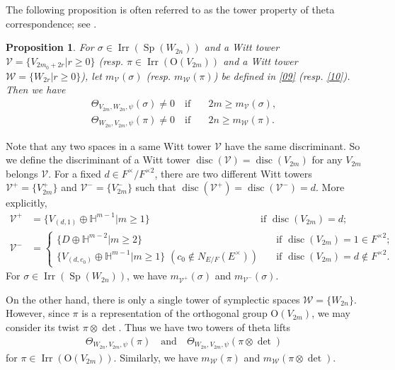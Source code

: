 \documentclass[article]{article}
\numberwithin{equation}{section}
\newtheorem{proposition}[theorem]{Proposition}
\theoremstyle{definition}
\DeclareMathOperator{\SP}{Sp}
\DeclareMathOperator{\Irr}{Irr}
\DeclareMathOperator{\disc}{disc}
\begin{document}
The following proposition is often referred to as the tower property of theta correspondence; see \cite{MR818351}. 
\begin{proposition}\label{tower}
For $\sigma \in \Irr(\SP(W_{2n}))$ and a Witt tower 
$\mathcal V=\{V_{2m_0+2r}|r\geq 0\}$ (resp. $\pi\in \Irr(\mathrm O(V_{2m}))$ and a Witt tower $\mathcal W=\{W_{2r}|r\geq 0\}$), let $m_{\mathcal V}(\sigma)$ (resp. $m_{\mathcal W}(\pi)$) be defined in \ref{09} (resp. \ref{10}). Then we have 
	\begin{align*}
	\Theta_{V_{2m},W_{2n},\psi}(\sigma)\neq 0 \quad \mbox{if}\quad& 2m\geq m_{\mathcal V}(\sigma),\\
	\Theta_{W_{2n},V_{2m},\psi}(\pi)\neq 0 \quad \mbox{if}\quad &2n\geq m_{\mathcal W}(\pi).
	\end{align*}
\end{proposition}
Note that any two spaces in a same Witt tower $\mathcal V$ have the same discriminant. So we define the discriminant of a Witt tower $\disc(\mathcal V)=\disc(V_{2m})$ for any $V_{2m}$ belongs $\mathcal V$. For a fixed $d\in F^\times /F^{\times 2}$, there are two different Witt towers $\mathcal V^+=\{V^+_{2m}\}$ and $\mathcal V^-=\{V^{-}_{2m}\}$ such that $\disc(\mathcal V^+)=\disc(\mathcal V^-)=d$. More explicitly,  
\begin{align*}
\mathcal V^+&=\{V_{(d,1)}\oplus \mathbb H^{m-1}|m\geq 1\} \qquad\qquad\qquad\qquad\qquad\quad \,\mbox{if $\disc(V_{2m})=d$};\\
\mathcal V^-&=\begin{cases*}
\{D\oplus \mathbb H^{m-2}|m\geq 2\} \quad &\mbox{if $\disc(V_{2m})=1\in F^{\times 2}$};\\
\{V_{(d,c_0)}\oplus \mathbb H^{m-1}|m\geq 1\}\,\, (c_0\notin N_{E/F}(E^\times))\quad &\mbox{if $\disc(V_{2m})=d\notin F^{\times 2}$}. 
\end{cases*} 
\end{align*}
For $\sigma\in \Irr(\SP(W_{2n}))$, we have $m_{\mathcal V^+}(\sigma)$ and $m_{\mathcal V^-}(\sigma)$. 

On the other hand, there is only a single tower of symplectic spaces $\mathcal W=\{W_{2n}\}$. However, since $\pi$ is a representation of the orthogonal group $\mathrm O(V_{2m})$, we may consider its twist $\pi\otimes\det$. Thus we have two towers of theta lifts 
\begin{align*}
\Theta_{W_{2n},V_{2m},\psi}(\pi)\quad \mbox{and}\quad  \Theta_{W_{2n},V_{2m},\psi}(\pi\otimes\det)
\end{align*}
for $\pi\in \Irr(\mathrm O(V_{2m}))$. Similarly, we have $m_{\mathcal W}(\pi)$ and $m_{\mathcal W}(\pi\otimes \det)$. 
\end{document}
